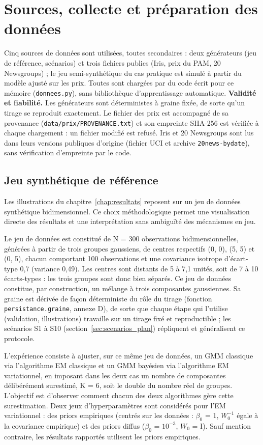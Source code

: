 
\section{Sources, collecte et préparation des données}\label{sec:donnees}
Cinq sources de données sont utilisées, toutes secondaires : deux générateurs (jeu de référence, scénarios) et trois fichiers publics (Iris, prix du PAM, 20 Newsgroups) ; le jeu semi-synthétique du cas pratique est simulé à partir du modèle ajusté sur les prix. Toutes sont chargées par du code écrit pour ce mémoire (\texttt{donnees.py}), sans bibliothèque d'apprentissage automatique. \textbf{Validité et fiabilité.} Les générateurs sont déterministes à graine fixée, de sorte qu'un tirage se reproduit exactement. Le fichier des prix est accompagné de sa provenance (\texttt{data/prix/PROVENANCE.txt}) et son empreinte SHA-256 est vérifiée à chaque chargement : un fichier modifié est refusé. Iris et 20 Newsgroups sont lus dans leurs versions publiques d'origine (fichier UCI et archive \texttt{20news-bydate}), sans vérification d'empreinte par le code.

\subsection{Jeu synthétique de référence}\label{sec:donnees_reference}
Les illustrations du chapitre~\ref{chap:resultats} reposent sur un jeu de données synthétique bidimensionnel. Ce choix méthodologique permet une visualisation directe des résultats et une interprétation sans ambiguïté des mécanismes en jeu.

Le jeu de données est constitué de N = 300 observations bidimensionnelles, générées à partir de trois groupes gaussiens, de centres respectifs (0, 0), (5, 5) et (0, 5), chacun comportant 100 observations et une covariance isotrope d'écart-type 0,7 (variance 0,49). Les centres sont distants de 5 à 7,1 unités, soit de 7 à 10 écarts-types : les trois groupes sont donc bien séparés. Ce jeu de données constitue, par construction, un mélange à trois composantes gaussiennes. Sa graine est dérivée de façon déterministe du rôle du tirage (fonction \texttt{persistance.graine}, annexe D), de sorte que chaque étape qui l'utilise (validation, illustrations) travaille sur un tirage fixé et reproductible ; les scénarios S1 à S10 (section~\ref{sec:scenarios_plan}) répliquent et généralisent ce protocole.

L'expérience consiste à ajuster, sur ce même jeu de données, un GMM classique via l'algorithme EM classique et un GMM bayésien via l'algorithme EM variationnel, en imposant dans les deux cas un nombre de composantes délibérément surestimé, K = 6, soit le double du nombre réel de groupes. L'objectif est d'observer comment chacun des deux algorithmes gère cette surestimation. Deux jeux d'hyperparamètres sont considérés pour l'EM variationnel : des priors empiriques (centrés sur les données : $\beta _{0}$ = 1, $W_{0}^{-1}$ égale à la covariance empirique) et des priors diffus ($\beta _{0}$ = $10^{-3}$, $W_{0}$ = I). Sauf mention contraire, les résultats rapportés utilisent les priors empiriques.

